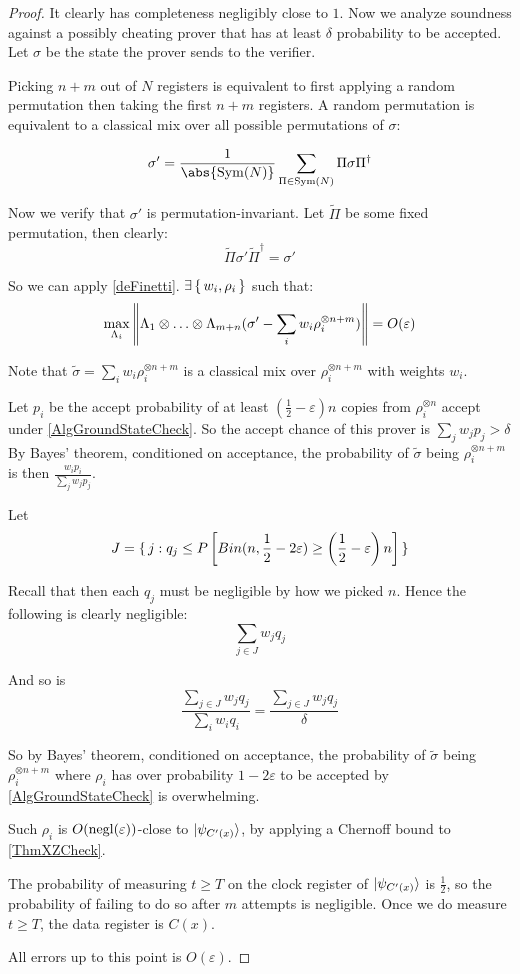 \begin{proof}
	It clearly has completeness negligibly close to $1$. Now we analyze soundness against a possibly cheating prover that has at least $\delta$ probability to be accepted. Let $\sigma$ be the state the prover sends to the verifier.

	Picking $n+m$ out of $N$ registers is equivalent to first applying a random permutation then taking the first $n+m$ registers.
	A random permutation is equivalent to a classical mix over all possible permutations of $\sigma$:

	$$\sigma'=\frac{1}{\abs{\Sym(N)}}\sum_{\Pi\in\Sym(N)}\Pi\sigma\Pi^\dagger$$

	Now we verify that $\sigma'$ is permutation-invariant.
	Let $\tilde{\Pi}$ be some fixed permutation, then clearly:
	$$\tilde{\Pi}\sigma'\tilde{\Pi}^\dagger=\sigma'$$

	So we can apply \autoref{deFinetti}. $\exists\set{w_i, \rho_i}$ such that:
	$$\max_{\Lambda_i}\left\lVert\Lambda_1\otimes\ldots\otimes\Lambda_{m+n}(\sigma'-\sum_i w_i\rho_i^{\otimes n+m})\right\rVert=O(\varepsilon)$$

	Note that $\tilde\sigma=\sum_i w_i\rho_i^{\otimes n+m}$ is a classical mix over $\rho_i^{\otimes n+m}$ with weights $w_i$.

	Let $p_i$ be the accept probability of at least $(\frac{1}{2}-\varepsilon)n$ copies from $\rho_i^{\otimes n}$ accept under \autoref{AlgGroundStateCheck}.
	So the accept chance of this prover is $\sum_j w_j p_j>\delta$
	By Bayes' theorem, conditioned on acceptance, the probability of $\tilde{\sigma}$ being $\rho_i^{\otimes n+m}$ is then $\frac{w_i p_i}{\sum_j w_j p_j}$.

	Let
	$$J=\set{j:q_j\leq P\left[Bin(n, \frac{1}{2}-2\varepsilon)\geq\left(\frac{1}{2}-\varepsilon\right)n\right]}$$

	Recall that then each $q_j$ must be negligible by how we picked $n$. Hence the following is clearly negligible:
	$$\sum_{j\in J} w_j q_j$$

	And so is
	$$\frac{\sum_{j\in J} w_j q_j}{\sum_i w_i q_i}=\frac{\sum_{j\in J} w_j q_j}{\delta}$$

	So by Bayes' theorem, conditioned on acceptance, the probability of $\tilde{\sigma}$ being $\rho_i^{\otimes n+m}$ where $\rho_i$ has over probability $1-2\varepsilon$ to be accepted by \autoref{AlgGroundStateCheck} is overwhelming.

	Such $\rho_i$ is $O(\operatorname{negl}(\varepsilon))$-close to $\ket{\psi_{C'(x)}}$, by applying a Chernoff bound to \autoref{ThmXZCheck}.

	The probability of measuring $t\geq T$ on the clock register of $\ket{\psi_{C'(x)}}$ is $\frac{1}{2}$, so the probability of failing to do so after $m$ attempts is negligible.
	Once we do measure $t\geq T$, the data register is $C(x)$.

	All errors up to this point is $O(\varepsilon)$.
\end{proof}

